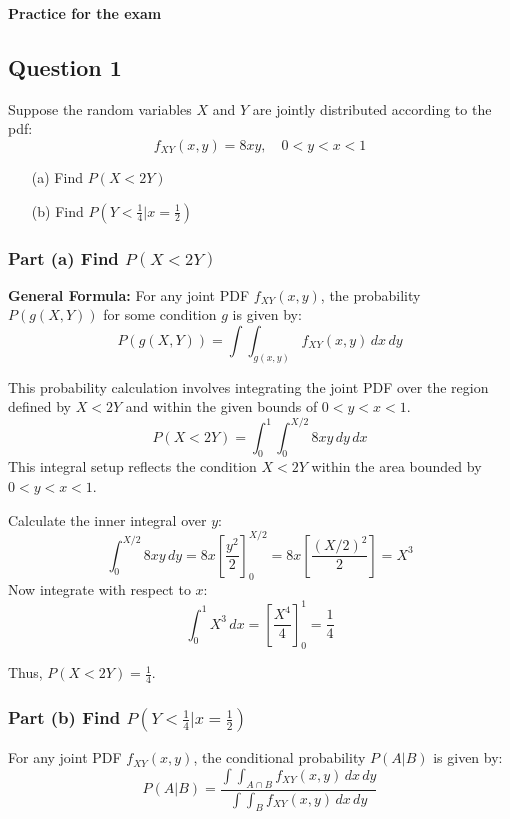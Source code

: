 \documentclass[12pt]{article}
\begin{document}
\begin{center}
  \Large \textbf{Practice for the exam}
\end{center}

\subsection*{Question 1}
Suppose the random variables \(X\) and \(Y\) are jointly distributed according to the pdf:
\[ f_{XY}(x,y) = 8xy, \quad 0 < y < x < 1 \]
\begin{itemize}
    \item[(a)] Find \( P(X < 2Y) \)
    \item[(b)] Find \( P(Y < \frac{1}{4} |  x = \frac{1}{2}) \)
\end{itemize}

\subsubsection*{Part (a) Find \( P(X < 2Y) \)}
\textbf{General Formula:}
For any joint PDF \( f_{XY}(x, y) \), the probability \( P(g(X, Y)) \) for some condition \( g \) is given by:
\[ P(g(X, Y)) = \int \int_{g(x, y)} f_{XY}(x, y) \, dx \, dy \]

This probability calculation involves integrating the joint PDF over the region defined by \( X < 2Y \) and within the given bounds of \( 0 < y < x < 1 \).
\[ 
P(X < 2Y) = \int_0^1 \int_0^{X/2} 8xy \, dy \, dx 
\]
This integral setup reflects the condition \( X < 2Y \) within the area bounded by \( 0 < y < x < 1 \).

Calculate the inner integral over \( y \):
\[
\int_0^{X/2} 8xy \, dy = 8x \left[ \frac{y^2}{2} \right]_0^{X/2} = 8x \left[ \frac{(X/2)^2}{2} \right] = X^3
\]
Now integrate with respect to \( x \):
\[
\int_0^1 X^3 \, dx = \left[ \frac{X^4}{4} \right]_0^1 = \frac{1}{4}
\]

Thus, \( P(X < 2Y) = \frac{1}{4} \).


\newpage
\subsubsection*{Part (b) Find \( P(Y < \frac{1}{4} |  x = \frac{1}{2}) \)}
For any joint PDF \( f_{XY}(x, y) \), the conditional probability \( P(A | B) \) is given by:
\[ P(A | B) = \frac{\int \int_{A \cap B} f_{XY}(x, y) \, dx \, dy}{\int \int_B f_{XY}(x, y) \, dx \, dy} \]
\end{document}
